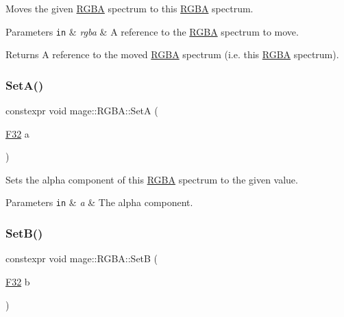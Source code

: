 Moves the given \mbox{\hyperlink{structmage_1_1_r_g_b_a}{R\+G\+BA}} spectrum to this \mbox{\hyperlink{structmage_1_1_r_g_b_a}{R\+G\+BA}} spectrum.


\begin{DoxyParams}[1]{Parameters}
\mbox{\tt in}  & {\em rgba} & A reference to the \mbox{\hyperlink{structmage_1_1_r_g_b_a}{R\+G\+BA}} spectrum to move. \\
\hline
\end{DoxyParams}
\begin{DoxyReturn}{Returns}
A reference to the moved \mbox{\hyperlink{structmage_1_1_r_g_b_a}{R\+G\+BA}} spectrum (i.\+e. this \mbox{\hyperlink{structmage_1_1_r_g_b_a}{R\+G\+BA}} spectrum). 
\end{DoxyReturn}
\mbox{\label{structmage_1_1_r_g_b_a_a3b2ebef3e0f2d26707b0fb84de8aec12}} 
\subsubsection{\texorpdfstring{Set\+A()}{SetA()}}
{\footnotesize\ttfamily constexpr void mage\+::\+R\+G\+B\+A\+::\+SetA (\begin{DoxyParamCaption}\item[{\mbox{\hyperlink{namespacemage_aa97e833b45f06d60a0a9c4fc22ae02c0}{F32}}}]{a }\end{DoxyParamCaption})\hspace{0.3cm}{\ttfamily [noexcept]}}

Sets the alpha component of this \mbox{\hyperlink{structmage_1_1_r_g_b_a}{R\+G\+BA}} spectrum to the given value.


\begin{DoxyParams}[1]{Parameters}
\mbox{\tt in}  & {\em a} & The alpha component. \\
\hline
\end{DoxyParams}
\mbox{\label{structmage_1_1_r_g_b_a_a3c7dccbc089f0a190f470c9dc74e7c51}} 
\subsubsection{\texorpdfstring{Set\+B()}{SetB()}}
{\footnotesize\ttfamily constexpr void mage\+::\+R\+G\+B\+A\+::\+SetB (\begin{DoxyParamCaption}\item[{\mbox{\hyperlink{namespacemage_aa97e833b45f06d60a0a9c4fc22ae02c0}{F32}}}]{b }\end{DoxyParamCaption})\hspace{0.3cm}{\ttfamily [noexcept]}}

